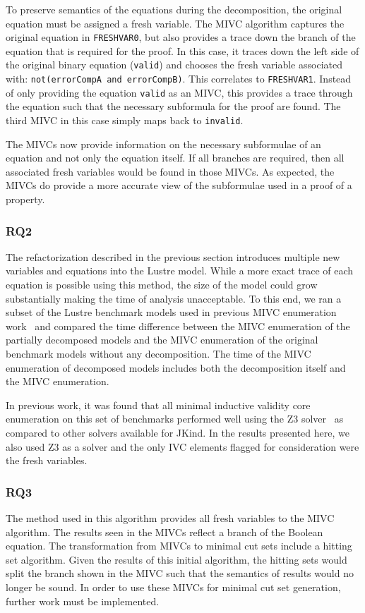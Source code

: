 To preserve semantics of the equations during the decomposition, the original equation must be assigned a fresh variable. The MIVC algorithm captures the original equation in \texttt{FRESHVAR0}, but also provides a trace down the branch of the equation that is required for the proof. In this case, it traces down the left side of the original binary equation (\texttt{valid}) and chooses the fresh variable associated with: \texttt{not(errorCompA and errorCompB)}. This correlates to \texttt{FRESHVAR1}. Instead of only providing the equation \texttt{valid} as an MIVC, this provides a trace through the equation such that the necessary subformula for the proof are found. The third MIVC in this case simply maps back to \texttt{invalid}. 

The MIVCs now provide information on the necessary subformulae of an equation and not only the equation itself. If all branches are required, then all associated fresh variables would be found in those MIVCs. As expected, the MIVCs do provide a more accurate view of the subformulae used in a proof of a property. 

\subsubsection{RQ2}
The refactorization described in the previous section introduces multiple new variables and equations into the Lustre model. While a more exact trace of each equation is possible using this method, the size of the model could grow substantially making the time of analysis unacceptable. To this end, we ran a subset of the Lustre benchmark models used in previous MIVC enumeration work~\cite{ghassabani_2018} and compared the time difference between the MIVC enumeration of the partially decomposed models and the MIVC enumeration of the original benchmark models without any decomposition. The time of the MIVC enumeration of decomposed models includes both the decomposition itself and the MIVC enumeration. 

In previous work, it was found that all minimal inductive validity core enumeration on this set of benchmarks performed well using the Z3 solver~\cite{ghassabani_2018, z3} as compared to other solvers available for JKind. In the results presented here, we also used Z3 as a solver and the only IVC elements flagged for consideration were the fresh variables. 

\subsubsection{RQ3}
The method used in this algorithm provides all fresh variables to the MIVC algorithm. The results seen in the MIVCs reflect a branch of the Boolean equation. The transformation from MIVCs to minimal cut sets include a hitting set algorithm. Given the results of this initial algorithm, the hitting sets would split the branch shown in the MIVC such that the semantics of results would no longer be sound. In order to use these MIVCs for minimal cut set generation, further work must be implemented. 

